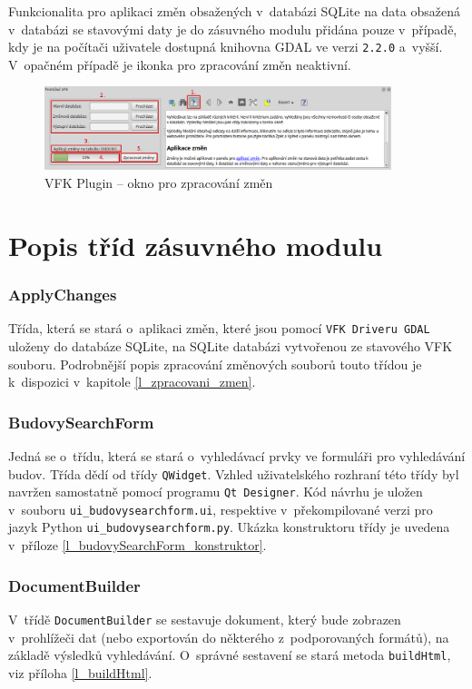 \documentclass[a4paper,12pt,oneside]{book}
\begin{document}
Funkcionalita pro aplikaci změn obsažených v~databázi SQLite na data obsažená v~databázi se stavovými daty je do zásuvného modulu přidána pouze v~případě, kdy je na počítači uživatele dostupná knihovna GDAL ve verzi \texttt{2.2.0} a~vyšší. V~opačném případě je ikonka pro zpracování změn neaktivní.

\begin{figure}[htb]
\centering
\includegraphics[width=0.9\textwidth]{images/vfkPlugin-zmeny.png}
\caption[VFK Plugin -- okno pro zpracování změn]{VFK Plugin -- okno pro zpracování změn}
\label{l_plugin_zmeny}
\end{figure}


\clearpage
\section{Popis tříd zásuvného modulu}

\subsubsection{ApplyChanges}
Třída, která se stará o~aplikaci změn, které jsou pomocí \texttt{VFK Driveru GDAL} uloženy do databáze SQLite, na SQLite databázi vytvořenou ze stavového VFK souboru. Podrobnější popis zpracování změnových souborů touto třídou je k~dispozici v~kapitole \ref{l_zpracovani_zmen}.

\subsubsection{BudovySearchForm}
Jedná se o~třídu, která se stará o~vyhledávací prvky ve formuláři pro vyhledávání budov. Třída dědí od třídy \texttt{QWidget}. Vzhled uživatelského rozhraní této třídy byl navržen samostatně pomocí programu \texttt{Qt Designer}. Kód návrhu je uložen v~souboru \texttt{ui\_budovysearchform.ui}, respektive v~překompilované verzi pro jazyk Python \texttt{ui\_budovysearchform.py}. Ukázka konstruktoru třídy je uvedena v~příloze \ref{l_budovySearchForm_konstruktor}.

\subsubsection{DocumentBuilder}
V~třídě \texttt{DocumentBuilder} se sestavuje dokument, který bude zobrazen v~prohlížeči dat (nebo exportován do některého z~podporovaných formátů), na základě výsledků vyhledávání. O~správné sestavení se stará metoda \texttt{buildHtml}, viz příloha \ref{l_buildHtml}. 
\end{document}
